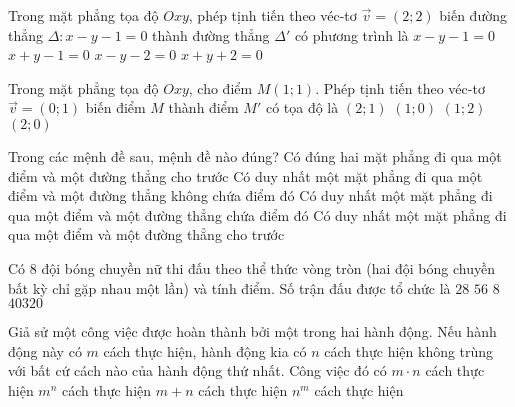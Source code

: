 \begin{ex}%
Trong mặt phẳng tọa độ $Oxy$, phép tịnh tiến theo véc-tơ $\vec{v}=(2;2)$ biến đường thẳng $\Delta \colon x-y-1=0$ thành đường thẳng $\Delta'$ có phương trình là
\choice
{\True $x-y-1=0$}
{$x+y-1=0$}
{$x-y-2=0$}
{$x+y+2=0$}
\end{ex}

\begin{ex}%
Trong mặt phẳng tọa độ $Oxy$, cho điểm $M(1;1)$. Phép tịnh tiến theo véc-tơ $\vec{v}=(0;1)$ biến điểm $M$ thành điểm $M'$ có tọa độ là
\choice
{$(2;1)$}
{$(1;0)$}
{\True $(1;2)$}
{$(2;0)$}
\end{ex}

\begin{ex}%
Trong các mệnh đề sau, mệnh đề nào đúng?
\choice
{Có đúng hai mặt phẳng đi qua một điểm và một đường thẳng cho trước}
{\True Có duy nhất một mặt phẳng đi qua một điểm và một đường thẳng không chứa điểm đó}
{Có duy nhất một mặt phẳng đi qua một điểm và một đường thẳng chứa điểm đó}
{Có duy nhất một mặt phẳng đi qua một điểm và một đường thẳng cho trước}
\end{ex}

\begin{ex}%
Có $8$ đội bóng chuyền nữ thi đấu theo thể thức vòng tròn (hai đội bóng chuyền bất kỳ chỉ gặp nhau một lần) và tính điểm. Số trận đấu được tổ chức là
\choice
{\True $28$}
{$56$}
{$8$}
{$40320$}
\end{ex}

\begin{ex}%
Giả sử một công việc được hoàn thành bởi một trong hai hành động. Nếu hành động này có $m$ cách thực hiện, hành động kia có $n$ cách thực hiện không trùng với bất cứ cách nào của hành động thứ nhất. Công việc đó có
\choice
{$m\cdot n$ cách thực hiện}
{$m^n$ cách thực hiện}
{\True $m+n$ cách thực hiện}
{$n^m$ cách thực hiện}
\end{ex}

